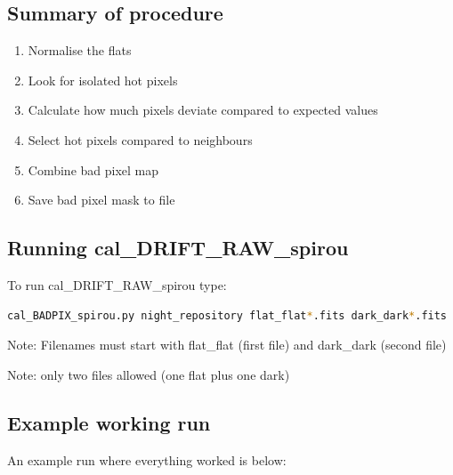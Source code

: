 \subsection{Summary of procedure}
\begin{enumerate}
	\item Normalise the flats
	\item Look for isolated hot pixels
	\item Calculate how much pixels deviate compared to expected values
	\item Select hot pixels compared to neighbours
	\item Combine bad pixel map
	\item Save bad pixel mask to file
\end{enumerate}

\subsection{Running cal\_DRIFT\_RAW\_spirou}

To run cal\_DRIFT\_RAW\_spirou type:
\begin{lstlisting}[language=bash, style=bashstyle]
cal_BADPIX_spirou.py night_repository flat_flat*.fits dark_dark*.fits
\end{lstlisting}

\noindent Note: Filenames must start with flat\_flat (first file) and dark\_dark (second file)

\noindent Note: only two files allowed (one flat plus one dark)

\subsection{Example working run}

An example run where everything worked is below:

